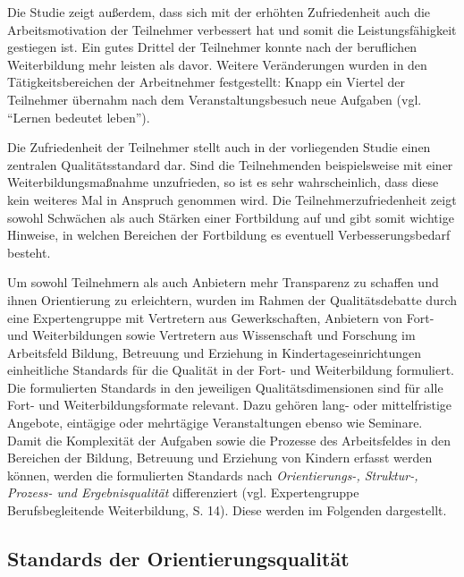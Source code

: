 \documentclass[12pt,a4paper]{article}
\begin{document}
Die Studie zeigt außerdem, dass sich mit der erhöhten Zufriedenheit auch die Arbeitsmotivation der Teilnehmer verbessert hat und somit die Leistungsfähigkeit gestiegen ist. Ein gutes Drittel der Teilnehmer konnte nach der beruflichen Weiterbildung mehr leisten als davor. Weitere Veränderungen wurden in den Tätigkeitsbereichen der Arbeitnehmer festgestellt: Knapp ein Viertel der Teilnehmer übernahm nach dem Veranstaltungsbesuch neue Aufgaben
(vgl. "`Lernen bedeutet leben"').

Die Zufriedenheit der Teilnehmer stellt auch in der vorliegenden Studie einen zentralen Qualitätsstandard dar. Sind die Teilnehmenden beispielsweise mit einer Weiterbildungsmaßnahme unzufrieden, so ist es sehr wahrscheinlich, dass diese kein weiteres Mal in Anspruch genommen wird. Die Teilnehmerzufriedenheit zeigt sowohl Schwächen als auch Stärken einer Fortbildung auf und gibt somit wichtige Hinweise, in welchen Bereichen der Fortbildung es eventuell Verbesserungsbedarf besteht. 

Um sowohl Teilnehmern als auch Anbietern mehr Transparenz zu schaffen und ihnen Orientierung zu erleichtern, wurden im Rahmen der Qualitätsdebatte durch eine Expertengruppe mit Vertretern aus Gewerkschaften, Anbietern von Fort- und Weiterbildungen sowie Vertretern aus Wissenschaft und Forschung im Arbeitsfeld Bildung, Betreuung und Erziehung  in Kindertageseinrichtungen einheitliche Standards für die Qualität in der Fort- und Weiterbildung formuliert. Die formulierten Standards in den jeweiligen Qualitätsdimensionen sind für alle Fort- und Weiterbildungsformate relevant. Dazu gehören lang- oder mittelfristige Angebote, eintägige oder mehrtägige Veranstaltungen ebenso wie Seminare. Damit die Komplexität der Aufgaben sowie die Prozesse des Arbeitsfeldes in den Bereichen der Bildung, Betreuung und Erziehung von Kindern erfasst werden können, werden die formulierten Standards nach \textit{Orientierungs-, Struktur-, Prozess- und Ergebnisqualität} differenziert (vgl. Expertengruppe Berufsbegleitende Weiterbildung, S. 14). Diese werden im Folgenden dargestellt. 
 
 \subsection{Standards der Orientierungsqualität}
 
\end{document}

